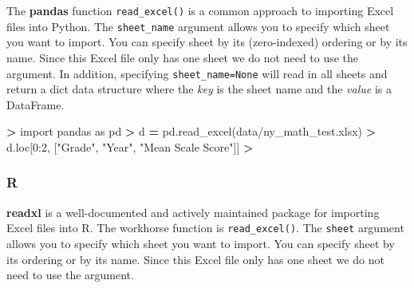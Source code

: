 \documentclass[
]{book}
\newenvironment{Shaded}{\begin{snugshade}}{\end{snugshade}}
\newcommand{\DecValTok}[1]{\textcolor[rgb]{0.00,0.00,0.81}{#1}}
\newcommand{\ImportTok}[1]{#1}
\newcommand{\NormalTok}[1]{#1}
\newcommand{\OperatorTok}[1]{\textcolor[rgb]{0.81,0.36,0.00}{\textbf{#1}}}
\newcommand{\StringTok}[1]{\textcolor[rgb]{0.31,0.60,0.02}{#1}}
\begin{document}
The \textbf{pandas} function \texttt{read\_excel()} is a common approach to importing Excel files into Python. The \texttt{sheet\_name} argument allows you to specify which sheet you want to import. You can specify sheet by its (zero-indexed) ordering or by its name. Since this Excel file only has one sheet we do not need to use the argument. In addition, specifying \texttt{sheet\_name=None} will read in all sheets and return a dict data structure where the \emph{key} is the sheet name and the \emph{value} is a DataFrame.

\begin{Shaded}
\begin{Highlighting}[]
\OperatorTok{\textgreater{}} \ImportTok{import}\NormalTok{ pandas }\ImportTok{as}\NormalTok{ pd  }
\OperatorTok{\textgreater{}}\NormalTok{ d }\OperatorTok{=}\NormalTok{ pd.read\_excel(}\StringTok{\textquotesingle{}data/ny\_math\_test.xlsx\textquotesingle{}}\NormalTok{)  }
\OperatorTok{\textgreater{}}\NormalTok{ d.loc[}\DecValTok{0}\NormalTok{:}\DecValTok{2}\NormalTok{, [}\StringTok{"Grade"}\NormalTok{, }\StringTok{"Year"}\NormalTok{, }\StringTok{"Mean Scale Score"}\NormalTok{]]  }
\OperatorTok{\textgreater{}} 
\end{Highlighting}
\end{Shaded}

\hypertarget{r-13}{%
\subsubsection*{R}\label{r-13}}

\textbf{readxl} is a well-documented and actively maintained package for importing Excel files into R. The workhorse function is \texttt{read\_excel()}. The \texttt{sheet} argument allows you to specify which sheet you want to import. You can specify sheet by its ordering or by its name. Since this Excel file only has one sheet we do not need to use the argument.
\end{document}
